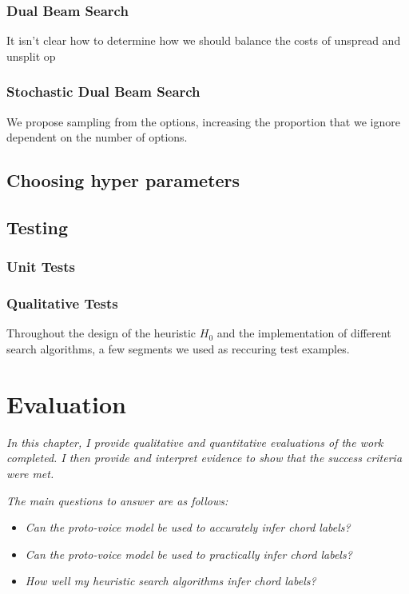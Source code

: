 \documentclass[12pt,a4paper,twoside,openright]{report}
\theoremstyle{definition}
\begin{document}
\subsection{Dual Beam Search}
It isn't clear how to determine how we should balance the costs of unspread and unsplit op

\subsection{Stochastic Dual Beam Search}
We propose sampling from the options, increasing the proportion that we ignore dependent on the number of options.

\section{Choosing hyper parameters}


\section{Testing}

\subsection{Unit Tests}

\subsection{Qualitative Tests}
 Throughout the design of the heuristic $H_0$ and the implementation of different search algorithms, a few segments we used as reccuring test examples.

\chapter{Evaluation}
\textit{In this chapter, I provide qualitative and quantitative evaluations of the work completed. I then provide and interpret evidence to show that the success criteria were met.}

\textit{The main questions to answer are as follows:}
\begin{itemize}
  \item \textit{Can the proto-voice model be used to accurately infer chord labels?}
  \item \textit{Can the proto-voice model be used to practically infer chord labels?}
  \item \textit{How well my heuristic search algorithms infer chord labels?}
\end{itemize}
\end{document}
